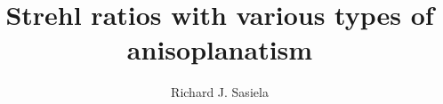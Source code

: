 %
\newcommand{\MF}{{\large{\manual META}\-{\manual FONT}}}
\newcommand{\manual}{rm}        %
\newcommand\bs{\char '134 }     %
%

\title{Strehl ratios with various types of anisoplanatism}

\author{Richard J. Sasiela}

\address{Lincoln Laboratory, Massachusetts Institute of Technology,
Lexington,  Massachusetts 02173-9108} %

